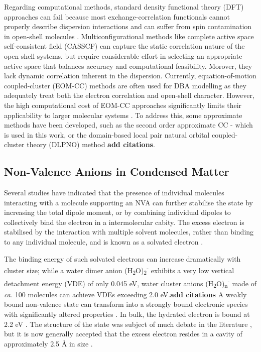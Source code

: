 Regarding computational methods, standard density functional theory (DFT) approaches can fail because most exchange-correlation functionals cannot properly describe dispersion interactions and can suffer from spin contamination in open-shell molecules \cite{thiam2023accurately}. Multiconfigurational methods like complete active space self-consistent field (CASSCF) can capture the static correlation nature of the open shell systems, but require considerable effort in selecting an appropriate active space that balances accuracy and computational feasibility. Morover, they lack dynamic correlation inherent in the dispersion. Currently, equation-of-motion coupled-cluster (EOM-CC) methods are often used for DBA modelling as they adequately treat both the electron correlation and open-shell character. However, the high computational cost of EOM-CC approaches significantly limits their applicability to larger molecular systems \cite{herbert2015quantum,jordan2003theory}. To address this, some approximate methods have been developed, such as the second order approximate CC \cite{christiansen1995second}- which is used in this work, or the domain-based local pair natural orbital coupled-cluster theory (DLPNO) method \cite{haldar2020multilayer}\textbf{add citations}.

\subsection{Non-Valence Anions in Condensed Matter}

Several studies have indicated that the presence of individual molecules interacting with a molecule supporting an NVA can further stabilise the state by increasing the total dipole moment, or by combining individual dipoles to collectively bind the electron in a intermolecular cabity. The excess electron is stabilised by the interaction with multiple solvent molecules, rather than binding to any individual molecule, and is known as a solvated electron \cite{jordan2003theory,herbert2015quantum,jalbout2001dipole,clarke2025role}. 

The binding energy of such solvated electrons can increase dramatically with cluster size; while a water dimer anion (H\textsubscript{2}O)\textsubscript{2}\textsuperscript{-} exhibits a very low vertical detachment energy (VDE) of only 0.045 eV, water cluster anions (H\textsubscript{2}O)\textsubscript{n}\textsuperscript{-} made of \emph{ca.} 100 molecules can achieve VDEs exceeding 2.0 eV.\textbf{add citations} A weakly bound non-valence state can transform into a strongly bound electronic species with significantly altered properties \cite{herbert2015quantum}. In bulk, the hydrated electron is bound at 2.2 eV \cite{jordan2003theory,herbert2017hydrated}. The structure of the state was subject of much debate in the literature \cite{herbert2017hydrated,jordan2003theory}, but it is now generally accepted that the excess electron resides in a cavity of approximately 2.5 \r{A} in size \cite{herbert2017hydrated}.

